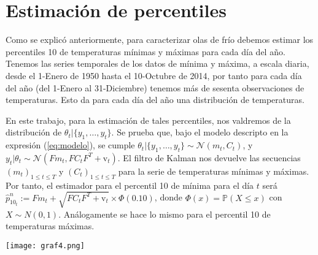 \documentclass{article}
\newcommand{\p}{\mathbb{P}}
\begin{document}
\section{Estimación de percentiles}

Como se explicó anteriormente, para caracterizar olas de frío debemos estimar los percentiles 10 de temperaturas mínimas y máximas para cada día del año. Tenemos las series temporales de los datos de mínima y máxima, a escala diaria, desde el 1-Enero de 1950 hasta el 10-Octubre de 2014, por tanto para cada día del año (del 1-Enero al 31-Diciembre) tenemos más de sesenta observaciones de temperaturas. Esto da para cada día del año una distribución de temperaturas.  %

En este trabajo, para la estimación de tales percentiles, nos valdremos de la distribución de $\theta_t | \{y_1,\dots,y_t\}$. Se prueba que, bajo el modelo descripto en la expresión (\ref{eq:modelo}), se cumple $\theta_t | \{y_1,\dots,y_t\} \sim \mathcal{N}(m_t,C_t)$, y $y_t|\theta_t \sim \mathcal{N}(Fm_t,FC_tF^T + \text{v}_t)$. El filtro de Kalman nos devuelve las secuencias $(m_t)_{1\leq t \leq T}$ y $(C_t)_{1\leq t \leq T}$ para la serie de temperaturas mínimas y máximas. Por tanto, el estimador para el percentil 10 de mínima para el día $t$ será $\hat{p}^n_{10_t}:=Fm_t+\sqrt{FC_tF^T + \text{v}_t}\times \Phi(0.10)$, donde $\Phi(x)=\p(X\leq x)$ con $X\sim N(0,1)$. Análogamente se hace lo mismo para el percentil 10 de temperaturas máximas.

\begin{center}
\texttt{[image: graf4.png]}
\label{fig:graf4}
\end{center}
\end{document}
